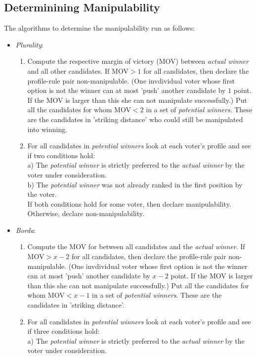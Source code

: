 \documentclass[10pt,a4paper]{article}
\begin{document}
\subsection{Determinining Manipulability}
\noindent The algorithms to determine the manipulability run as follows:\\
\begin{itemize}
\item \textit{Plurality}: \begin{enumerate}
\item  Compute the respective margin of victory (MOV) between \textit{actual winner} and all other candidates. If MOV$>1$ for all candidates, then declare the profile-rule pair non-manipulable. (One invdividual voter whose first option is not the winner can at most 'push' another candidate by $1$ point. If the MOV is larger than this she can not manipulate successfully.) Put all the candidates for whom MOV$<2$ in a set of \textit{potential winners}. These are the candidates in 'striking distance' who could still be manipulated into winning.
\item For all candidates in \textit{potential winners} look at each voter's profile and see if two conditions hold: \\
a) The \textit{potential winner} is strictly preferred to the \textit{actual winner} by the voter under consideration.\\
b) The \textit{potential winner} was not already ranked in the first position by the voter.\\
If both conditions hold for some voter, then declare manipulability. Otherwise, declare non-manipulability.
\end{enumerate}
\item \textit{Borda}: \begin{enumerate}
\item Compute the MOV for between all candidates and the \textit{actual winner}. If MOV$>x-2$ for all candidates, then declare the profile-rule pair non-manipulable. (One invdividual voter whose first option is not the winner can at most 'push' another candidate by $x-2$ point. If the MOV is larger than this she can not manipulate successfully.) Put all the candidates for whom MOV$<x-1$ in a set of \textit{potential winners}. These are the candidates in 'striking distance'.
\item For all candidates in \textit{potential winners} look at each voter's profile and see if three conditions hold: \\
a) The \textit{potential winner} is strictly preferred to the \textit{actual winner} by the voter under consideration.\\

\end{enumerate}
\end{itemize}
\end{document}

